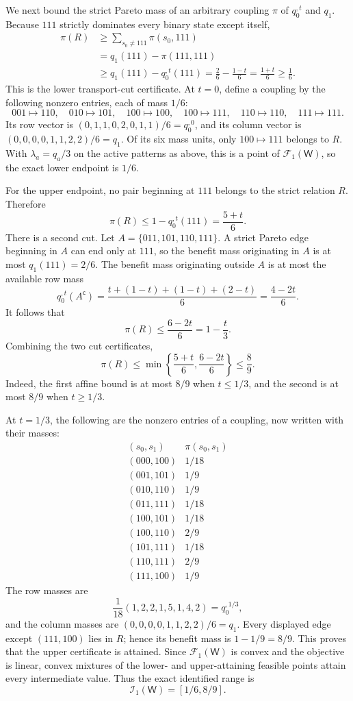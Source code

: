 We next bound the strict Pareto mass of an arbitrary coupling \(\pi\) of \(q_0^{,t}\) and \(q_1\).  Because \(111\) strictly dominates every binary state except itself,
\[
\begin{aligned}
\pi(R)
&\ge \sum_{s_0\ne111}\pi(s_0,111)\\
&=q_1(111)-\pi(111,111)\\
&\ge q_1(111)-q_0^{,t}(111)
=\frac{2}{6}-\frac{1-t}{6}
=\frac{1+t}{6}
\ge\frac16.
\end{aligned}
\]
This is the lower transport-cut certificate.  At \(t=0\), define a coupling by the following nonzero entries, each of mass \(1/6\):
\[
001\mapsto110,
\quad010\mapsto101,
\quad100\mapsto100,
\quad100\mapsto111,
\quad110\mapsto110,
\quad111\mapsto111.
\]
Its row vector is \((0,1,1,0,2,0,1,1)/6=q_0^{,0}\), and its column vector is \((0,0,0,0,1,1,2,2)/6=q_1\).  Of its six mass units, only \(100\mapsto111\) belongs to \(R\).  With \(\lambda_a=q_a/3\) on the active patterns as above, this is a point of \(\mathcal F_1(\mathsf W)\), so the exact lower endpoint is \(1/6\).

For the upper endpoint, no pair beginning at \(111\) belongs to the strict relation \(R\).  Therefore
\[
\pi(R)\le1-q_0^{,t}(111)=\frac{5+t}{6}.
\]
There is a second cut.  Let \(A=\{011,101,110,111\}\).  A strict Pareto edge beginning in \(A\) can end only at \(111\), so the benefit mass originating in \(A\) is at most \(q_1(111)=2/6\).  The benefit mass originating outside \(A\) is at most the available row mass
\[
q_0^{,t}(A^{\mathsf c})
=\frac{t+(1-t)+(1-t)+(2-t)}6
=\frac{4-2t}{6}.
\]
It follows that
\[
\pi(R)\le\frac{6-2t}{6}=1-\frac{t}{3}.
\]
Combining the two cut certificates,
\[
\pi(R)\le
\min\!\left\{\frac{5+t}{6},\frac{6-2t}{6}\right\}
\le\frac89.
\]
Indeed, the first affine bound is at most \(8/9\) when \(t\le1/3\), and the second is at most \(8/9\) when \(t\ge1/3\).

At \(t=1/3\), the following are the nonzero entries of a coupling, now written with their masses:
\[
\begin{array}{c|c}
(s_0,s_1)&\pi(s_0,s_1)\\ \hline
(000,100)&1/18\\
(001,101)&1/9\\
(010,110)&1/9\\
(011,111)&1/18\\
(100,101)&1/18\\
(100,110)&2/9\\
(101,111)&1/18\\
(110,111)&2/9\\
(111,100)&1/9
\end{array}
\]
The row masses are
\[
\frac1{18}(1,2,2,1,5,1,4,2)=q_0^{,1/3},
\]
and the column masses are \((0,0,0,0,1,1,2,2)/6=q_1\).  Every displayed edge except \((111,100)\) lies in \(R\); hence its benefit mass is \(1-1/9=8/9\).  This proves that the upper certificate is attained.  Since \(\mathcal F_1(\mathsf W)\) is convex and the objective is linear, convex mixtures of the lower- and upper-attaining feasible points attain every intermediate value.  Thus the exact identified range is
\[
\mathcal I_1(\mathsf W)=[1/6,8/9].
\]


